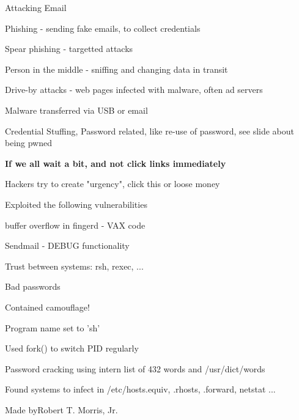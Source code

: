 \documentclass[Screen16to9,17pt]{foils}
\begin{document}

Attacking Email
\begin{list2}
\item Phishing - sending fake emails, to collect credentials
\item Spear phishing - targetted attacks
\item Person in the middle - sniffing and changing data in transit
\item Drive-by attacks - web pages infected with malware, often ad servers
\item Malware transferred via USB or email
\item Credential Stuffing, Password related, like re-use of password, see slide about being pwned
\end{list2}

\vskip 1cm
\centerline{\Large\bf If we all wait a bit, and not click links immediately}

\vskip 1cm
Hackers try to create "urgency", click this or loose money



\begin{list1}
\item Exploited the following vulnerabilities
\begin{list2}
\item buffer overflow in fingerd - VAX code
\item Sendmail - DEBUG functionality
\item Trust between systems: rsh, rexec, ...
\item Bad passwords
\end{list2}
\item Contained camouflage!
\begin{list2}
\item Program name set to 'sh'
\item Used fork() to switch PID regularly
\item Password cracking using intern list of 432 words and /usr/dict/words
\item Found systems to infect in /etc/hosts.equiv, .rhosts, .forward, netstat ...
\end{list2}
\item Made byRobert T. Morris, Jr.
\end{list1}



\end{document}
